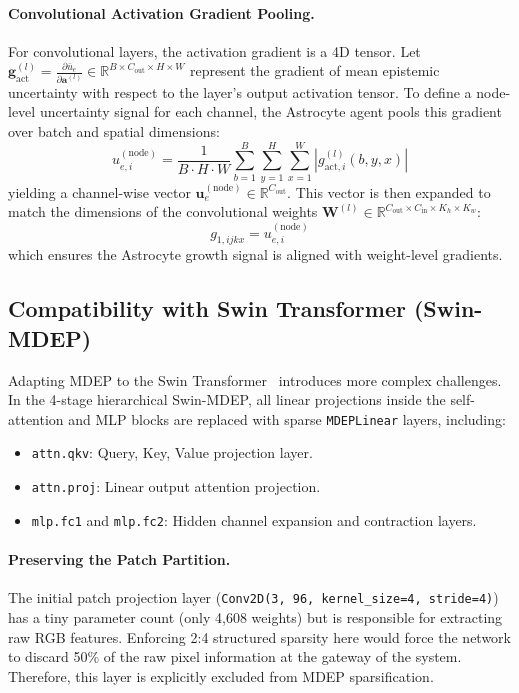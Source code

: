 \documentclass[11pt, a4paper]{article}
\newcommand{\R}{\mathbb{R}}
\begin{document}
\paragraph{Convolutional Activation Gradient Pooling.}
For convolutional layers, the activation gradient is a 4D tensor. Let $\bm{g}_{\text{act}}^{(l)} = \frac{\partial \bar{u}_e}{\partial \bm{a}^{(l)}} \in \R^{B \times C_{\text{out}} \times H \times W}$ represent the gradient of mean epistemic uncertainty with respect to the layer's output activation tensor. To define a node-level uncertainty signal for each channel, the Astrocyte agent pools this gradient over batch and spatial dimensions:
\begin{equation}\label{eq:conv_pooling}
    u_{e,i}^{(\text{node})} = \frac{1}{B \cdot H \cdot W} \sum_{b=1}^B \sum_{y=1}^H \sum_{x=1}^W \left| g_{\text{act}, i}^{(l)}(b, y, x) \right|
\end{equation}
yielding a channel-wise vector $\bm{u}_e^{(\text{node})} \in \R^{C_{\text{out}}}$. This vector is then expanded to match the dimensions of the convolutional weights $\bm{W}^{(l)} \in \R^{C_{\text{out}} \times C_{\text{in}} \times K_h \times K_w}$:
\begin{equation}
    g_{1, ijkx} = u_{e,i}^{(\text{node})}
\end{equation}
which ensures the Astrocyte growth signal is aligned with weight-level gradients.

\subsection{Compatibility with Swin Transformer (Swin-MDEP)}\label{subsec:swin}

Adapting MDEP to the Swin Transformer~\cite{liu2021swin, liu2022swinv2} introduces more complex challenges. In the 4-stage hierarchical Swin-MDEP, all linear projections inside the self-attention and MLP blocks are replaced with sparse \texttt{MDEPLinear} layers, including:
\begin{itemize}
    \item \texttt{attn.qkv}: Query, Key, Value projection layer.
    \item \texttt{attn.proj}: Linear output attention projection.
    \item \texttt{mlp.fc1} and \texttt{mlp.fc2}: Hidden channel expansion and contraction layers.
\end{itemize}

\paragraph{Preserving the Patch Partition.}
The initial patch projection layer (\texttt{Conv2D(3, 96, kernel\_size=4, stride=4)}) has a tiny parameter count (only 4,608 weights) but is responsible for extracting raw RGB features. Enforcing 2:4 structured sparsity here would force the network to discard 50\% of the raw pixel information at the gateway of the system. Therefore, this layer is explicitly excluded from MDEP sparsification.
\end{document}
